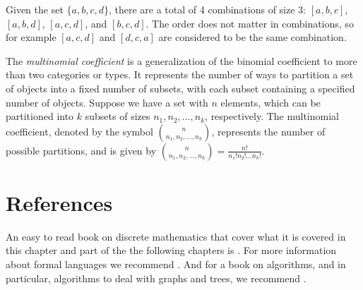 \begin{example}
Given the set $\{a, b, c, d \}$, there are a total of 4 combinations of size 3: $[a, b, c]$, $[a, b, d]$, $[a, c, d]$, and $[b, c, d]$. The order does not matter in combinations, so for example $[a, c, d]$ and $[d, c, a]$ are considered to be the same combination.
\end{example}

The \emph{multinomial coefficient} is a generalization of the binomial coefficient to more than two categories or types. It represents the number of ways to partition a set of objects into a fixed number of subsets, with each subset containing a specified number of objects. Suppose we have a set with $n$ elements, which can be partitioned into $k$ subsets of sizes $n_1, n_2, \ldots, n_k$, respectively. The multinomial coefficient, denoted by the symbol ${n \choose n_{1},n_{2},\ldots,n_{k}}$, represents the number of possible partitions, and is given by ${n \choose n_{1},n_{2},\ldots,n_{k}} = \frac{n!}{n_{1}!n_{2}!\ldots n_{k}!}$.

\section*{References}

An easy to read book on discrete mathematics that cover what it is covered in this chapter and part of the the following chapters is \cite{johnsonbaugh2009discrete}. For more information about formal languages we recommend \cite{sipser2012introduction}. And for a book on algorithms, and in particular, algorithms to deal with graphs and trees, we recommend \cite{cormen1990introduction}.
